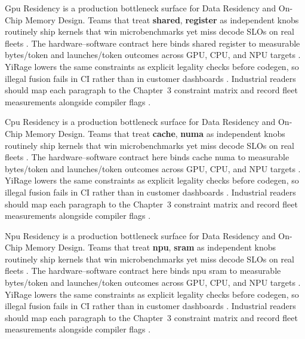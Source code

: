 Gpu Residency is a production bottleneck surface for Data Residency and On-Chip Memory Design. Teams that treat \textbf{shared}, \textbf{register} as independent knobs routinely ship kernels that win microbenchmarks yet miss decode SLOs on real fleets \citep{nvidia2024cudagraphs,taxbreak2026}. The hardware--software contract here binds shared register to measurable bytes/token and launches/token outcomes across GPU, CPU, and NPU targets \citep{liu2024deepseekv3,memoryfloor2026}. YiRage lowers the same constraints as explicit legality checks before codegen, so illegal fusion fails in CI rather than in customer dashboards \citep{patel2025llminference,nvidia2022hopper}. Industrial readers should map each paragraph to the Chapter~3 constraint matrix and record fleet measurements alongside compiler flags \citep{taxbreak2026,semianalysis2024tma}.

Cpu Residency is a production bottleneck surface for Data Residency and On-Chip Memory Design. Teams that treat \textbf{cache}, \textbf{numa} as independent knobs routinely ship kernels that win microbenchmarks yet miss decode SLOs on real fleets \citep{liu2024deepseekv3,memoryfloor2026}. The hardware--software contract here binds cache numa to measurable bytes/token and launches/token outcomes across GPU, CPU, and NPU targets \citep{patel2025llminference,nvidia2022hopper}. YiRage lowers the same constraints as explicit legality checks before codegen, so illegal fusion fails in CI rather than in customer dashboards \citep{taxbreak2026,semianalysis2024tma}. Industrial readers should map each paragraph to the Chapter~3 constraint matrix and record fleet measurements alongside compiler flags \citep{memoryfloor2026,amd2024xdna}.

Npu Residency is a production bottleneck surface for Data Residency and On-Chip Memory Design. Teams that treat \textbf{npu}, \textbf{sram} as independent knobs routinely ship kernels that win microbenchmarks yet miss decode SLOs on real fleets \citep{patel2025llminference,nvidia2022hopper}. The hardware--software contract here binds npu sram to measurable bytes/token and launches/token outcomes across GPU, CPU, and NPU targets \citep{taxbreak2026,semianalysis2024tma}. YiRage lowers the same constraints as explicit legality checks before codegen, so illegal fusion fails in CI rather than in customer dashboards \citep{memoryfloor2026,amd2024xdna}. Industrial readers should map each paragraph to the Chapter~3 constraint matrix and record fleet measurements alongside compiler flags \citep{nvidia2022hopper,amd2024aie}.


